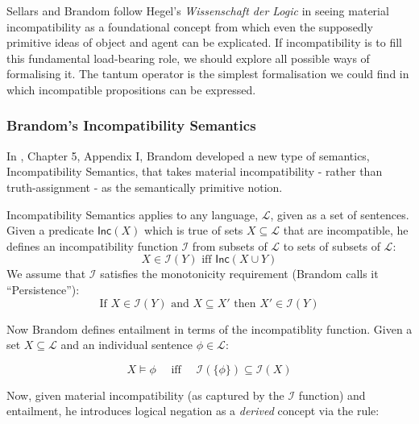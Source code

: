 
\NI Sellars and Brandom follow Hegel's \emph{Wissenschaft der Logic}
\cite{HegelGWF:wisdlog} in seeing material incompatibility as a
foundational concept from which even the supposedly primitive ideas of
object and agent can be explicated.  If incompatibility is to fill
this fundamental load-bearing role, we should explore all possible
ways of formalising it.  The tantum operator is the simplest
formalisation we could find in which incompatible propositions can be
expressed.

\subsubsection{Brandom's Incompatibility Semantics}

\NI In \cite{brandom}, Chapter 5, Appendix I, Brandom developed a new
type of semantics, Incompatibility Semantics, that takes material
incompatibility - rather than truth-assignment - as the semantically
primitive notion.

Incompatibility Semantics applies to any language, $\mathcal{L}$,
given as a set of sentences.  Given a predicate $\mathsf{Inc}(X)$ which is true of sets $X \subseteq \mathcal{L}$ that are incompatible, he defines an incompatibility function
$\mathcal{I}$ from subsets of $\mathcal{L}$ to sets of subsets of $\mathcal{L}$:
\[
X \in \mathcal{I}(Y) \text{ iff } \mathsf{Inc}(X \cup Y)
\]
We assume that $\mathcal{I}$ satisfies the
monotonicity requirement (Brandom calls it ``Persistence''):
\[
   \text{If } X \in \mathcal{I}(Y) \text{ and } X \subseteq X' \text{ then } X' \in \mathcal{I}(Y)
\]

\NI Now Brandom defines entailment in terms of the incompatiblity
function. Given a set $X \subseteq \mathcal{L}$ and an individual
sentence $\phi \in \mathcal{L}$:

\[
   X \models \phi\quad \text{ iff }\quad \mathcal{I}(\{\phi\}) \subseteq \mathcal{I}(X)
\]

\NI Now, given material incompatibility (as captured by the
$\mathcal{I}$ function) and entailment, he introduces logical negation
as a \emph{derived} concept via the rule:

